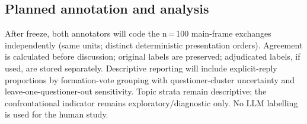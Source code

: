 \subsection{Planned annotation and analysis}

After freeze, both annotators will code the n\,=\,100 main-frame exchanges
independently (same units; distinct deterministic presentation orders).
Agreement is calculated before discussion; original labels are preserved;
adjudicated labels, if used, are stored separately. Descriptive reporting will
include explicit-reply proportions by formation-vote grouping with
questioner-cluster uncertainty and leave-one-questioner-out sensitivity.
Topic strata remain descriptive; the confrontational indicator remains
exploratory/diagnostic only. No LLM labelling is used for the human study.
